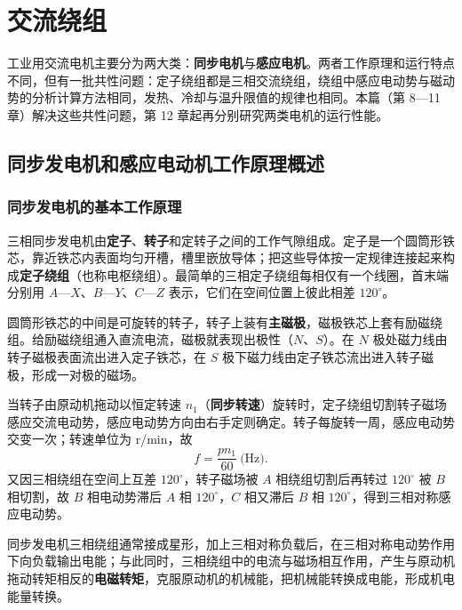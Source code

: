 \chapter{交流绕组}

工业用交流电机主要分为两大类：\textbf{同步电机}与\textbf{感应电机}。两者工作原理和运行特点不同，但有一批共性问题：定子绕组都是三相交流绕组，绕组中感应电动势与磁动势的分析计算方法相同，发热、冷却与温升限值的规律也相同。本篇（第 8—11 章）解决这些共性问题，第 12 章起再分别研究两类电机的运行性能。

\section{同步发电机和感应电动机工作原理概述}

\subsection{同步发电机的基本工作原理}
三相同步发电机由\textbf{定子}、\textbf{转子}和定转子之间的工作气隙组成。定子是一个圆筒形铁芯，靠近铁芯内表面均匀开槽，槽里嵌放导体；把这些导体按一定规律连接起来构成\textbf{定子绕组}（也称电枢绕组）。最简单的三相定子绕组每相仅有一个线圈，首末端分别用 $A$—$X$、$B$—$Y$、$C$—$Z$ 表示，它们在空间位置上彼此相差 $120^\circ$。

圆筒形铁芯的中间是可旋转的转子，转子上装有\textbf{主磁极}，磁极铁芯上套有励磁绕组。给励磁绕组通入直流电流，磁极就表现出极性（$N$、$S$）。在 $N$ 极处磁力线由转子磁极表面流出进入定子铁芯，在 $S$ 极下磁力线由定子铁芯流出进入转子磁极，形成一对极的磁场。

当转子由原动机拖动以恒定转速 $n_1$（\textbf{同步转速}）旋转时，定子绕组切割转子磁场感应交流电动势，感应电动势方向由右手定则确定。转子每旋转一周，感应电动势交变一次；转速单位为 r/min，故
\begin{equation}
f=\frac{pn_1}{60}\ \text{(Hz)} .
\end{equation}
又因三相绕组在空间上互差 $120^\circ$，转子磁场被 $A$ 相绕组切割后再转过 $120^\circ$ 被 $B$ 相切割，故 $B$ 相电动势滞后 $A$ 相 $120^\circ$，$C$ 相又滞后 $B$ 相 $120^\circ$，得到三相对称感应电动势。

同步发电机三相绕组通常接成星形，加上三相对称负载后，在三相对称电动势作用下向负载输出电能；与此同时，三相绕组中的电流与磁场相互作用，产生与原动机拖动转矩相反的\textbf{电磁转矩}，克服原动机的机械能，把机械能转换成电能，形成机电能量转换。

